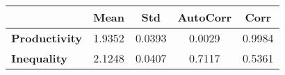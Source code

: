 \begin{tiny}\begin{tabular}{|l|c|c|c|c|}
\hline
&\textbf{Mean}&\textbf{Std}&\textbf{AutoCorr}&\textbf{Corr}\\\hline
\textbf{Productivity}&1.9352&0.0393&0.0029&0.9984\\\hline
\textbf{Inequality}&2.1248&0.0407&0.7117&0.5361\\\hline
\end{tabular}
\end{tiny}